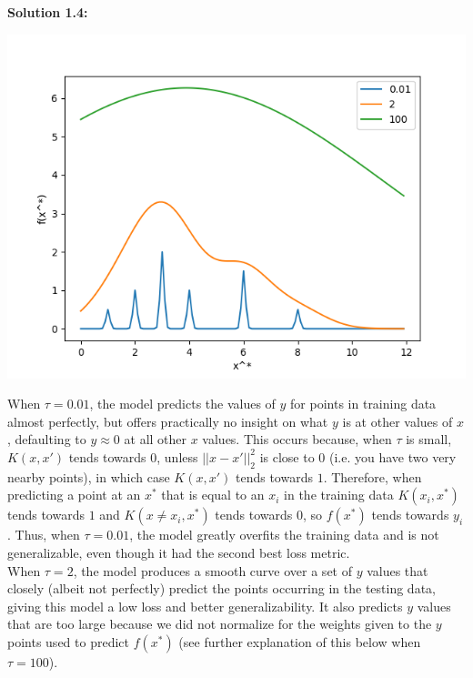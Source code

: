 \documentclass[submit]{harvardml}
\begin{document}
\bigskip
\noindent\textbf{Solution 1.4:}\\
\begin{center}
    \includegraphics[scale=0.7]{1.4.png}
\end{center}
When $\tau = 0.01$, the model predicts the values of $y$ for points in training data almost perfectly, but offers practically no insight on what $y$ is at other values of $x$, defaulting to $y \approx 0$ at all other $x$ values. This occurs because, when $\tau$ is small, $K(x, x')$ tends towards $0$, unless $||x-x'||^2_2$ is close to $0$ (i.e. you have two very nearby points), in which case $K(x, x')$ tends towards $1$. Therefore, when predicting a point at an $x^*$ that is equal to an $x_i$ in the training data $K(x_i, x^*)$ tends towards $1$ and $K(x \ne x_i, x^*)$ tends towards $0$, so $f(x^*)$ tends towards $y_i$. Thus, when $\tau = 0.01$, the model greatly overfits the training data and is not generalizable, even though it had the second best loss metric.\\

\noindent When $\tau = 2$, the model produces a smooth curve over a set of $y$ values that closely (albeit not perfectly) predict the points occurring in the testing data, giving this model a low loss and better generalizability. It also predicts $y$ values that are too large because we did not normalize for the weights given to the $y$ points used to predict $f(x^*)$ (see further explanation of this below when $\tau = 100$).\\
\end{document}
